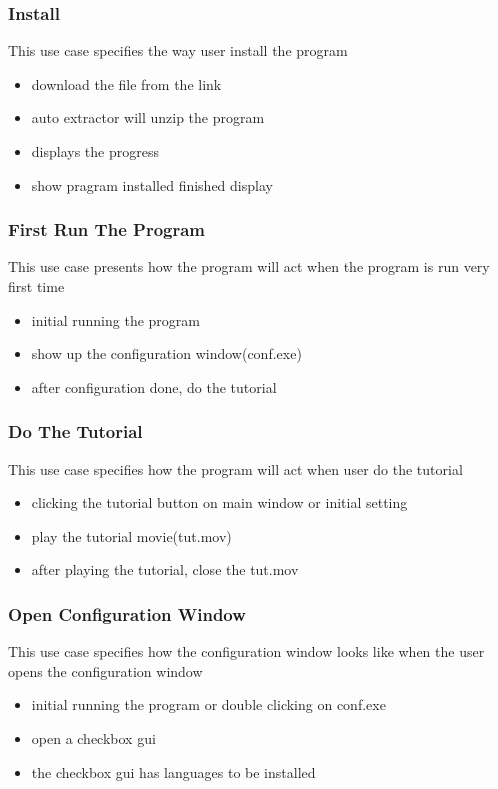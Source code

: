\documentclass[conference]{IEEEtran}
\begin{document}
\subsubsection{Install}
This use case specifies the way user install the program

\begin{itemize}
  \item download the file from the link
  \item auto extractor will unzip the program
  \item displays the progress
  \item show pragram installed finished display
\end{itemize}
\textit{}



\subsubsection{First Run The Program}
This use case presents how the program will act when the program is run very first time
\begin{itemize}
  \item initial running the program
  \item show up the configuration window(conf.exe)
  \item after configuration done, do the tutorial
\end{itemize}
\textit{}



\subsubsection{Do The Tutorial}
This use case specifies how the program will act when user do the tutorial
\begin{itemize}
  \item clicking the tutorial button on main window or initial setting 
  \item play the tutorial movie(tut.mov)
  \item after playing the tutorial, close the tut.mov
\end{itemize}
\textit{}



\subsubsection{Open Configuration Window}
This use case specifies how the configuration window looks like when the user opens the configuration window
\begin{itemize}
  \item initial running the program or double clicking on conf.exe
  \item open a checkbox gui
  \item the checkbox gui has languages to be installed
\end{itemize}
\textit{}
\end{document}
